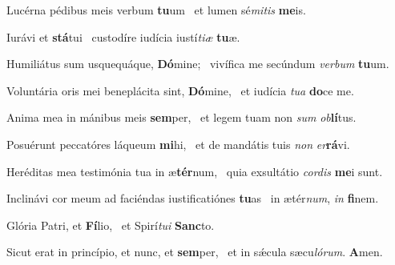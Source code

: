 \item Lucérna pédibus meis verbum \textbf{tu}um~\psstar{} et lumen sé\textit{mitis} \textbf{me}is.

\item Iurávi et \textbf{stá}tui~\psstar{} custodíre iudícia iustí\textit{tiæ} \textbf{tu}æ.

\item Humiliátus sum usquequáque, \textbf{Dó}mine;~\psstar{} vivífica me secúndum \textit{verbum} \textbf{tu}um.

\item Voluntária oris mei beneplácita sint, \textbf{Dó}mine,~\psstar{} et iudícia \textit{tua} \textbf{do}ce me.

\item Anima mea in mánibus meis \textbf{sem}per,~\psstar{} et legem tuam non \textit{sum} \textit{ob}\textbf{lí}tus.

\item Posuérunt peccatóres láqueum \textbf{mi}hi,~\psstar{} et de mandátis tuis \textit{non} \textit{er}\textbf{rá}vi.

\item Heréditas mea testimónia tua in æ\textbf{tér}num,~\psstar{} quia exsultátio \textit{cordis} \textbf{me}i sunt.

\item Inclinávi cor meum ad faciéndas iustificatiónes \textbf{tu}as~\psstar{} in ætér\textit{num}, \textit{in} \textbf{fi}nem.

\item Glória Patri, et \textbf{Fí}lio,~\psstar{} et Spirí\textit{tui} \textbf{Sanc}to.

\item Sicut erat in princípio, et nunc, et \textbf{sem}per,~\psstar{} et in sǽcula sæcu\textit{lórum}. \textbf{A}men.